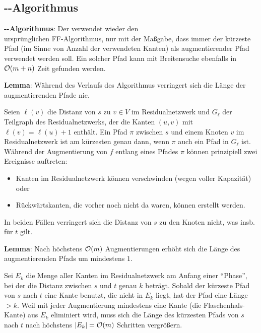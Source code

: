 \subsection{%
    --Algorithmus%
}

\textbf{--Algorithmus}:
Der  verwendet wieder den\\
ursprünglichen FF-Algorithmus, nur mit der Maßgabe, dass
immer der kürzeste Pfad (im Sinne von Anzahl der verwendeten Kanten) als augmentierender Pfad
verwendet werden soll.
Ein solcher Pfad kann mit Breitensuche ebenfalls in $\mathcal{O}(m + n)$ Zeit gefunden werden.

\linie

\textbf{Lemma}:
Während des Verlaufs des Algorithmus verringert sich die Länge der augmentierenden Pfade nie.

\begin{Beweis}
    Seien $\ell(v)$ die Distanz von $s$ zu $v \in V$ im Residualnetzwerk und
    $G_\ell$ der Teilgraph des Residualnetzwerks, der die Kanten $(u, v)$ mit
    $\ell(v) = \ell(u) + 1$ enthält.
    Ein Pfad $\pi$ zwischen $s$ und einem Knoten $v$ im Residualnetzwerk ist am kürzesten
    genau dann, wenn $\pi$ auch ein Pfad in $G_\ell$ ist.
    Während der Augmentierung von $f$ entlang eines Pfades $\pi$ können prinzipiell zwei Ereignisse
    auftreten:
    \begin{itemize}
        \item
        Kanten im Residualnetzwerk können verschwinden (wegen voller Kapazität) oder

        \item
        Rückwärtskanten, die vorher noch nicht da waren, können erstellt werden.
    \end{itemize}
    In beiden Fällen verringert sich die Distanz von $s$ zu den Knoten nicht,
    was insb. für $t$ gilt.
\end{Beweis}

\textbf{Lemma}:
Nach höchstens $\mathcal{O}(m)$ Augmentierungen erhöht sich die Länge des augmentierenden Pfads um
mindestens $1$.

\begin{Beweis}
    Sei $E_k$ die Menge aller Kanten im Residualnetzwerk am Anfang einer "`Phase"', bei der
    die Distanz zwischen $s$ und $t$ genau $k$ beträgt.
    Sobald der kürzeste Pfad von $s$ nach $t$ eine Kante benutzt, die nicht in $E_k$ liegt,
    hat der Pfad eine Länge $> k$.
    Weil mit jeder Augmentierung mindestens eine Kante (die Flaschenhals-Kante) aus $E_k$
    eliminiert wird, muss sich die Länge des kürzesten Pfads von $s$ nach $t$ nach höchstens
    $|E_k| = \mathcal{O}(m)$ Schritten vergrößern.
\end{Beweis}

